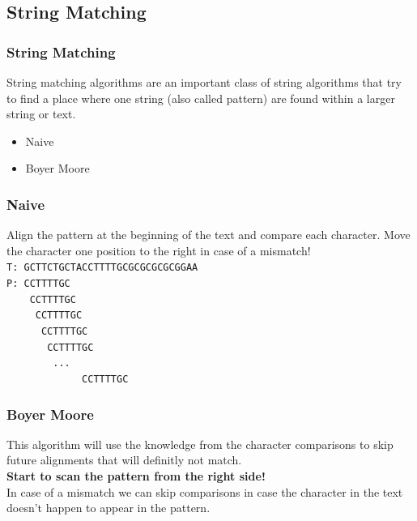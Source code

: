 \subsection{String Matching}

\begin{frame}[fragile] 
  \frametitle{String Matching}
  String matching algorithms are an important class of string algorithms that try
  to find a place where one string (also called pattern) are found within a larger
  string or text.
  \vspace{3mm}
  \begin{itemize}
  \item Naive
  \item Boyer Moore
  \end{itemize}
\end{frame}

\begin{frame}[fragile] 
  \frametitle{Naive}
  Align the pattern at the beginning of the text and compare each character.
  Move the character one position to the right in case of a mismatch!\\
  \vspace{3mm}
  {\small
  \verb|T: GCTTCTGCTACCTTTTGCGCGCGCGCGGAA|\\
  \verb|P: CCTTTTGC|\\
  \verb|    CCTTTTGC|\\
  \verb|     CCTTTTGC|\\
  \verb|      CCTTTTGC|\\
  \verb|       CCTTTTGC|\\
  \verb|        ...|\\
  \verb|             CCTTTTGC|\\
  }
\end{frame}

\begin{frame}[fragile] 
  \frametitle{Boyer Moore}
  This algorithm will use the knowledge from the character comparisons to skip
  future alignments that will definitly not match.\\
  {\bf Start to scan the pattern from the right side!}\\
  In case of a mismatch we can skip comparisons in case the character in the text
  doesn’t happen to appear in the pattern.
\end{frame}

